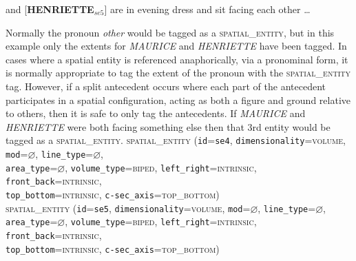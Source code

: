 \documentclass[11pt]{article}
\newcommand{\entity}[2]{[\textbf{\color{darkblue}#1}$_{se#2}$]}
\newenvironment{note}
{\list{}
 {\setlength
  {\itemindent}
  {\listparindent}}
   \item[\textbf{Note:}]\relax}
{\endlist}
\begin{document}
{	\item \entity{MAURICE}{4} and \entity{HENRIETTE}{5} are in evening dress and sit facing each other \ldots
    \begin{note}
        Normally the pronoun \emph{other} would be tagged as a \textsc{spatial\_entity}, but in this example only the extents for \emph{MAURICE} and \emph{HENRIETTE} have been tagged. In cases where a spatial entity is referenced anaphorically, via a pronominal form, it is normally appropriate to tag the extent of the pronoun with the \textsc{spatial\_entity} tag. However, if a split antecedent occurs where each part of the antecedent participates in a spatial configuration, acting as both a figure and ground relative to others, then it is safe to only tag the antecedents. If \emph{MAURICE} and \emph{HENRIETTE} were both facing something else then that 3rd entity would be tagged as a \textsc{spatial\_entity}.
    \end{note}
        \textsc{spatial\_entity}
            (\texttt{id}=\texttt{se4},
            \texttt{dimensionality}=\textsc{volume},
            \texttt{mod}=$\varnothing$,
            \texttt{line\_type}=$\varnothing$,\\
            \texttt{area\_type}=$\varnothing$,
            \texttt{volume\_type}=\textsc{biped},
            \texttt{left\_right}=\textsc{intrinsic},
            \texttt{front\_back}=\textsc{intrinsic},\\
            \texttt{top\_bottom}=\textsc{intrinsic},
            \texttt{c-sec\_axis}=\textsc{top\_bottom})\vspace{0.5em}\\
        \textsc{spatial\_entity}
            (\texttt{id}=\texttt{se5},
            \texttt{dimensionality}=\textsc{volume},
            \texttt{mod}=$\varnothing$,
            \texttt{line\_type}=$\varnothing$,\\
            \texttt{area\_type}=$\varnothing$,
            \texttt{volume\_type}=\textsc{biped},
            \texttt{left\_right}=\textsc{intrinsic},
            \texttt{front\_back}=\textsc{intrinsic},\\
            \texttt{top\_bottom}=\textsc{intrinsic},
            \texttt{c-sec\_axis}=\textsc{top\_bottom})        
        \label{ex:maurice_henriette}
        
}
\end{document}
